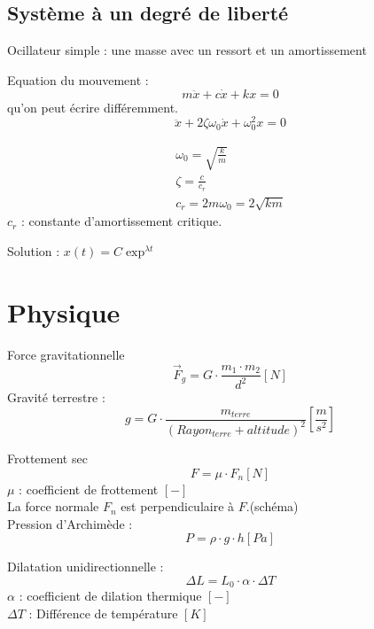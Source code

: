 \documentclass[12pt,a4paper,twoside]{article}
\numberwithin{equation}{subsection}
\begin{document}
\subsection{Système à un degré de liberté}

Ocillateur simple : une masse avec un ressort et un amortissement

Equation du mouvement :
\begin{equation}
m \ddot{x} + c \dot{x}+k x =0
\end{equation}
qu'on peut écrire différemment. 
\begin{equation}
\ddot{x} + 2\zeta \omega_0 \dot{x}+\omega_0^2  x =0
\end{equation}

\begin{eqnarray}
\omega_0=\sqrt{\frac{k}{m}}\\
\zeta=\frac{c}{c_r}\\
c_r=2 m \omega_0=2\sqrt{km}
\end{eqnarray}
$c_r$ : constante d'amortissement critique. 

Solution : $x(t)=C \exp^{\lambda t}$

\newpage
\section{Physique}
Force gravitationnelle
\begin{equation}
\vec{F}_g=G\cdot \frac{m_1 \cdot m_2}{d^2} [N]
\end{equation}
Gravité terrestre : 
\begin{equation}
g=G\cdot \frac{m_{terre}}{(Rayon_{terre}+altitude)^2}[\frac{m}{s^2}]
\end{equation}

Frottement sec
\begin{equation}
F=\mu \cdot F_n [N]
\end{equation}
$\mu$ : coefficient de frottement $[-]$\\
La force normale $F_n$ est perpendiculaire à $F$.(schéma)\\


Pression d'Archimède :
\begin{equation}
P=\rho \cdot g \cdot h [Pa]
\end{equation}

Dilatation unidirectionnelle :
\begin{equation}
\Delta L=L_0 \cdot \alpha  \cdot \Delta T
\end{equation}
$\alpha$ : coefficient de dilation thermique $[-]$\\
$\Delta T$ : Différence de température $[K]$\\
\end{document}
